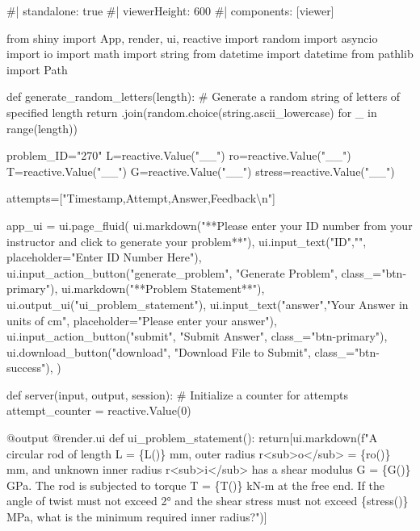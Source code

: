 \documentclass[
  letterpaper,
  DIV=11,
  numbers=noendperiod]{scrreprt}
\newenvironment{Shaded}{\begin{snugshade}}{\end{snugshade}}
\newcommand{\NormalTok}[1]{\textcolor[rgb]{0.00,0.23,0.31}{#1}}
\begin{document}
\begin{Shaded}
\begin{Highlighting}[]
\NormalTok{\#| standalone: true}
\NormalTok{\#| viewerHeight: 600}
\NormalTok{\#| components: [viewer]}

\NormalTok{from shiny import App, render, ui, reactive}
\NormalTok{import random}
\NormalTok{import asyncio}
\NormalTok{import io}
\NormalTok{import math}
\NormalTok{import string}
\NormalTok{from datetime import datetime}
\NormalTok{from pathlib import Path}

\NormalTok{def generate\_random\_letters(length):}
\NormalTok{    \# Generate a random string of letters of specified length}
\NormalTok{    return \textquotesingle{}\textquotesingle{}.join(random.choice(string.ascii\_lowercase) for \_ in range(length)) }

\NormalTok{problem\_ID="270"}
\NormalTok{L=reactive.Value("\_\_")}
\NormalTok{ro=reactive.Value("\_\_")}
\NormalTok{T=reactive.Value("\_\_")}
\NormalTok{G=reactive.Value("\_\_")}
\NormalTok{stress=reactive.Value("\_\_")}

\NormalTok{attempts=["Timestamp,Attempt,Answer,Feedback\textbackslash{}n"]}

\NormalTok{app\_ui = ui.page\_fluid(}
\NormalTok{    ui.markdown("**Please enter your ID number from your instructor and click to generate your problem**"),}
\NormalTok{    ui.input\_text("ID","", placeholder="Enter ID Number Here"),}
\NormalTok{    ui.input\_action\_button("generate\_problem", "Generate Problem", class\_="btn{-}primary"),}
\NormalTok{    ui.markdown("**Problem Statement**"),}
\NormalTok{    ui.output\_ui("ui\_problem\_statement"),}
\NormalTok{    ui.input\_text("answer","Your Answer in units of cm", placeholder="Please enter your answer"),}
\NormalTok{    ui.input\_action\_button("submit", "Submit Answer", class\_="btn{-}primary"),}
\NormalTok{    ui.download\_button("download", "Download File to Submit", class\_="btn{-}success"),}
\NormalTok{)}


\NormalTok{def server(input, output, session):}
\NormalTok{    \# Initialize a counter for attempts}
\NormalTok{    attempt\_counter = reactive.Value(0)}

\NormalTok{    @output}
\NormalTok{    @render.ui}
\NormalTok{    def ui\_problem\_statement():}
\NormalTok{        return[ui.markdown(f"A circular rod of length L = \{L()\} mm, outer radius r\textless{}sub\textgreater{}o\textless{}/sub\textgreater{} = \{ro()\} mm, and unknown inner radius r\textless{}sub\textgreater{}i\textless{}/sub\textgreater{} has a shear modulus G = \{G()\} GPa. The rod is subjected to torque T = \{T()\} kN{-}m at the free end. If the angle of twist must not exceed 2° and the shear stress must not exceed \{stress()\} MPa, what is the minimum required inner radius?")]}
    

\end{Highlighting}
\end{Shaded}
\end{document}
